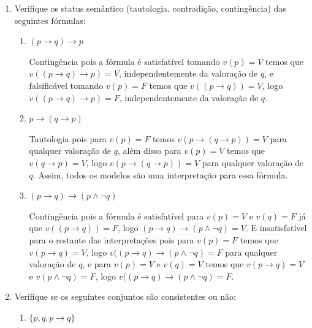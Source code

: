 \begin{enumerate}[label=\arabic*., left=0.5cm, align=left, nosep]
                \hspace{5cm} $\varphi = \lnot \big( (\lnot (p \lor (q \land \lnot p))) \to r \big)$
            
            \vspace{0.5cm}
            \item Verifique os status semântico (tautologia, contradição, contingência) das seguintes fórmulas:
                \begin{enumerate}[label=(\alph*), left=0.5cm, align=left, nosep]
                    \item$(p \to q) \to p$
                        
                        Contingência pois a fórmula é satisfatível tomando $v(p) = V$ temos que $v((p \to q) \to p) = V$, independentemente 
                        da valoração de $q$, e falsificável tomando $v(p) = F$ temos que $v((p \to q)) = V$, logo $v((p \to q) \to p) = F$, 
                        independentemente da valoração de $q$.

                    \item $p \to (q \to p)$
                        
                        Tautologia pois para $v(p) = F$ temos $v(p \to (q \to p)) = V$ para qualquer valoração de $q$, além disso para
                        $v(p) = V$ temos que $v(q \to p) = V$, logo $v(p \to (q \to p)) = V$ para qualquer valoração de $q$. Assim,
                        todos os modelos são uma interpretação para essa fórmula.

                    \item $(p \to q) \to (p \land \neg q)$
                    
                        Contingência pois a fórmula é satisfatível para $v(p) = V$ e $v(q) = F$ já que $v((p \to q)) = F$, logo
                        $(p \to q) \to (p \land \neg q) = V$. E insatisfatível para o restante das interpretações pois para 
                        $v(p) = F$ temos que $v(p \to q) = V$, logo $v((p \to q) \to (p \land \neg q) = F$ para qualquer valoração 
                        de $q$, e para $v(p) = V$ e $v(q) = V$ temos que $v(p \to q) = V$ e $v(p \land \neg q) = F$, logo 
                        $v((p \to q) \to (p \land \neg q) = F$. 
                  
                \end{enumerate}
        
            \item Verifique se os seguintes conjuntos são consistentes ou não:
                \begin{enumerate}[label=(\alph*), left=0.5cm, align=left, nosep]
                    \item $\{p, q, p \to q\}$


\end{enumerate}
\end{enumerate}
